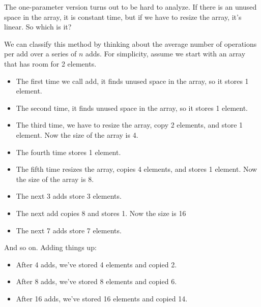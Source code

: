 \documentclass[12pt]{book}
\theoremstyle{exercise}
\begin{document}
The one-parameter version turns out to be hard to analyze. If there is
an unused space in the array, it is constant time, but if we have to
resize the array, it's linear. So which is it?

We can classify this method by thinking about the average number of
operations per add over a series of $n$ adds. For simplicity,
assume we start with an array that has room for 2 elements.

\begin{itemize}

\item
  The first time we call add, it finds unused space in the array, so it
  stores 1 element.

\item
  The second time, it finds unused space in the array, so it stores 1
  element.

\item
  The third time, we have to resize the array, copy 2 elements, and
  store 1 element. Now the size of the array is 4.

\item
  The fourth time stores 1 element.

\item
  The fifth time resizes the array, copies 4 elements, and stores 1
  element. Now the size of the array is 8.

\item
  The next 3 adds store 3 elements.

\item
  The next add copies 8 and stores 1. Now the size is 16

\item
  The next 7 adds store 7 elements.

\end{itemize}

And so on. Adding things up:

\begin{itemize}

\item
  After 4 adds, we've stored 4 elements and copied 2.

\item
  After 8 adds, we've stored 8 elements and copied 6.

\item
  After 16 adds, we've stored 16 elements and copied 14.

\end{itemize}
\end{document}
